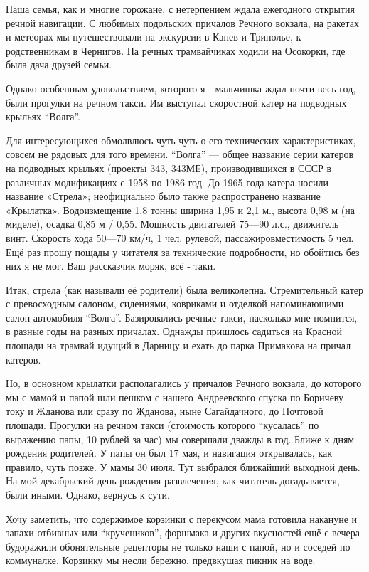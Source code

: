 Наша семья, как и многие горожане, с нетерпением ждала ежегодного открытия
речной навигации. С любимых подольских причалов Речного вокзала, на ракетах и
метеорах мы путешествовали на экскурсии в Канев и Триполье, к родственникам в
Чернигов. На речных трамвайчиках ходили на Осокорки, где была дача друзей
семьи. 

Однако особенным удовольствием, которого я - мальчишка ждал почти весь год,
были прогулки на речном такси. Им выступал скоростной катер на подводных
крыльях \enquote{Волга}. 

Для интересующихся обмолвлюсь чуть-чуть о его технических характеристиках,
совсем не рядовых для того времени. \enquote{Волга} — общее название серии
катеров на подводных крыльях (проекты 343, 343МЕ), производившихся в СССР в
различных модификациях с 1958 по 1986 год. До 1965 года катера носили название
«Стрела»; неофициально было также распространено название «Крылатка».
Водоизмещение 1,8 тонны ширина 1,95 и 2,1 м., высота 0,98 м (на миделе), осадка
0,85 м / 0,55. Мощность двигателей 75—90 л.с., движитель винт. Скорость хода
50—70 км/ч, 1 чел. рулевой, пассажировместимость 5 чел. Ещё раз прошу пощады у
читателя за технические подробности, но обойтись без них я не мог. Ваш
рассказчик моряк, всё - таки. 

Итак, стрела (как называли её родители) была великолепна. Стремительный катер с
превосходным салоном, сидениями, ковриками и отделкой напоминающими салон
автомобиля \enquote{Волга}. Базировались речные такси, насколько мне помнится,
в разные годы на разных причалах. Однажды пришлось садиться на Красной площади
на трамвай идущий в Дарницу и ехать до парка Примакова на причал катеров. 

Но, в основном крылатки располагались у причалов Речного вокзала, до которого
мы с мамой и папой шли пешком с нашего Андреевского спуска по Боричеву току и
Жданова или сразу по Жданова, ныне Сагайдачного, до Почтовой площади. Прогулки
на речном такси (стоимость которого \enquote{кусалась} по выражению папы, 10
рублей за час) мы совершали дважды в год.  Ближе к дням рождения родителей. У
папы он был 17 мая, и навигация открывалась, как правило, чуть позже. У мамы 30
июля. Тут выбрался ближайший выходной день.  На мой декабрьский день рождения
развлечения, как читатель догадывается, были иными. Однако, вернусь к сути. 

Хочу заметить, что содержимое корзинки с перекусом мама готовила накануне и
запахи отбивных или \enquote{кручеников}, форшмака и других вкусностей ещё с
вечера будоражили обонятельные рецепторы не только наши с папой, но и соседей
по коммуналке. Корзинку мы несли бережно, предвкушая пикник на воде. 

